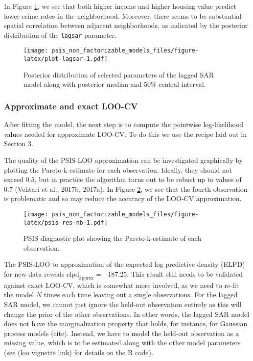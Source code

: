 \documentclass[english,,doc,floatsintext]{apa6}
\theoremstyle{definition}
\theoremstyle{definition}
\theoremstyle{definition}
\theoremstyle{remark}
\begin{document}
In Figure \ref{fig:plot-lagsar}, we see that both higher income and
higher housing value predict lower crime rates in the neighborhood.
Moreover, there seems to be substantial spatial correlation between
adjacent neighborhoods, as indicated by the posterior distribution of
the \texttt{lagsar} parameter.

\begin{figure}
\centering
\texttt{[image: psis\_non\_factorizable\_models\_files/figure-latex/plot-lagsar-1.pdf]}
\caption{\label{fig:plot-lagsar}Posterior distribution of selected
parameters of the lagged SAR model along with posterior median and 50\%
central interval.}
\end{figure}

\hypertarget{approximate-and-exact-loo-cv}{%
\subsubsection{Approximate and exact
LOO-CV}\label{approximate-and-exact-loo-cv}}

After fitting the model, the next step is to compute the pointwise
log-likelihood values needed for approximate LOO-CV. To do this we use
the recipe laid out in Section 3.

The quality of the PSIS-LOO approximation can be investigated
graphically by plotting the Pareto-k estimate for each observation.
Ideally, they should not exceed \(0.5\), but in practice the algorithm
turns out to be robust up to values of \(0.7\) (Vehtari et al., 2017b,
2017a). In Figure \ref{fig:psis-res-nb}, we see that the fourth
observation is problematic and so may reduce the accuracy of the LOO-CV
approximation.

\begin{figure}
\centering
\texttt{[image: psis\_non\_factorizable\_models\_files/figure-latex/psis-res-nb-1.pdf]}
\caption{\label{fig:psis-res-nb}PSIS diagnostic plot showing the
Pareto-k-estimate of each observation.}
\end{figure}

The PSIS-LOO to approximation of the expected log predictive density
(ELPD) for new data reveals \(\text{elpd}_{\text{approx}} =\) -187.25.
This result still needs to be validated against exact LOO-CV, which is
somewhat more involved, as we need to re-fit the model \(N\) times each
time leaving out a single observations. For the lagged SAR model, we
cannot just ignore the held-out observation entirely as this will change
the prior of the other observations. In other words, the lagged SAR
model does not have the marginalization property that holds, for
instance, for Gaussian process models (cite). Instead, we have to model
the held-out observation as a missing value, which is to be estimated
along with the other model parameters (see (loo vignette link) for
details on the R code).
\end{document}

